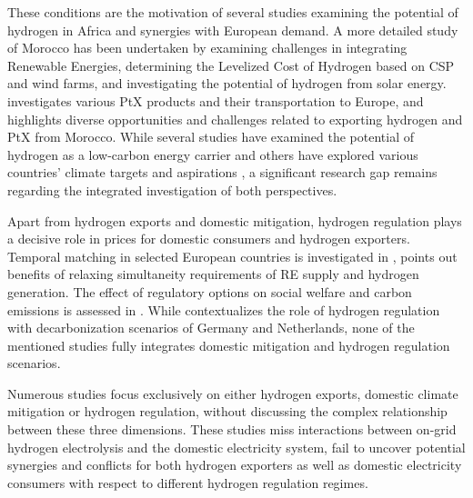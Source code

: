 These conditions are the motivation of several studies \cite{vanWijk2021, AbouSeada2022, vanderZwaan2021, Schellekens2010, Cavana2021, Touili2022, Timmerberg2019a, Sens2022} examining the potential of hydrogen in Africa and synergies with European demand. A more detailed study of Morocco has been undertaken by \cite{Boulakhbar2020} examining challenges in integrating Renewable Energies, \cite{Khouya2020} determining the Levelized Cost of Hydrogen based on CSP and wind farms, and \cite{Touili2018} investigating the potential of hydrogen from solar energy. \cite{Hampp2021} investigates various PtX products and their transportation to Europe, and \cite{Eichhammer2019} highlights diverse opportunities and challenges related to exporting hydrogen and PtX from Morocco. While several studies\cite{Hampp2021, AbouSeada2022, vanWijk2021} have examined the potential of hydrogen as a low-carbon energy carrier and others have explored various countries' climate targets and aspirations \cite{Boulakhbar2020}, a significant research gap remains regarding the integrated investigation of both perspectives. 


Apart from hydrogen exports and domestic mitigation, hydrogen regulation plays a decisive role in prices for domestic consumers and hydrogen exporters. Temporal matching in selected European countries is investigated in \cite{Zeyen2022}, \cite{Ruhnau2023a} points out benefits of relaxing simultaneity requirements of RE supply and hydrogen generation. 
The effect of regulatory options on social welfare and carbon emissions is assessed in \cite{Brauer2022}. 
While \cite{Zeyen2022} contextualizes the role of hydrogen regulation with decarbonization scenarios of Germany and Netherlands, none of the mentioned studies fully integrates domestic mitigation and hydrogen regulation scenarios.

Numerous studies focus exclusively on either hydrogen exports, domestic climate mitigation or hydrogen regulation, without discussing the complex relationship between these three dimensions. These studies miss interactions between on-grid hydrogen electrolysis and the domestic electricity system, fail to uncover potential synergies and conflicts for both hydrogen exporters as well as domestic electricity consumers with respect to different hydrogen regulation regimes.


